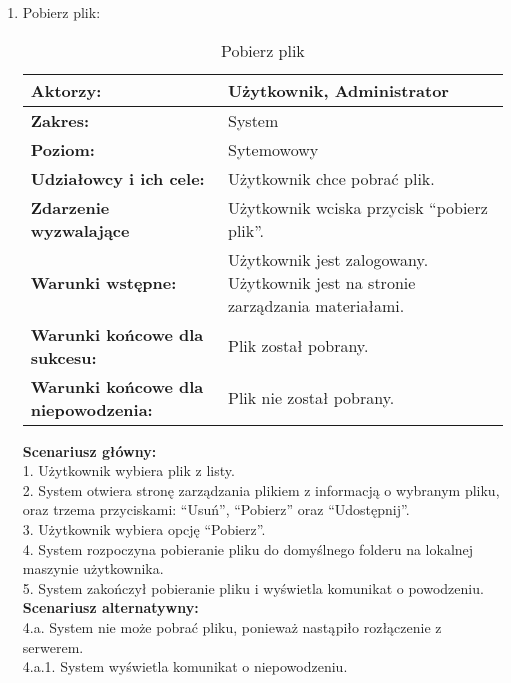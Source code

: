 \begin{enumerate}[label=(\Roman*)]
\item Pobierz plik:
	\begin{table}[H]
\centering
\caption{Pobierz plik}
\label{Pobierzplik}
\begin{tabular}{|p{7cm}|p{7cm}|}
  \hline 
  \textbf{Aktorzy:} & Użytkownik, Administrator\\
  \hline
  \textbf{Zakres:} & System \\
	\hline
  \textbf{Poziom:} & Sytemowowy \\
	\hline
  \textbf{Udziałowcy i ich cele: } & Użytkownik chce pobrać plik. \\
	\hline
  \textbf{Zdarzenie wyzwalające } & Użytkownik wciska przycisk “pobierz plik”. \\
	\hline
  \textbf{Warunki wstępne: } & Użytkownik jest zalogowany. Użytkownik jest na stronie zarządzania materiałami.
 \\
	\hline
  \textbf{Warunki końcowe dla sukcesu:} & Plik został pobrany.\\
	\hline
  \textbf{Warunki końcowe dla niepowodzenia:} & Plik nie został pobrany. \\
  \hline
\end{tabular} 
\end{table}

\textbf{Scenariusz główny:}\\
1. Użytkownik wybiera plik z listy.\\
2. System otwiera stronę zarządzania plikiem z informacją o wybranym pliku, oraz trzema przyciskami: “Usuń”, “Pobierz” oraz “Udostępnij”.\\
3. Użytkownik wybiera opcję “Pobierz”.\\
4. System rozpoczyna pobieranie pliku do domyślnego folderu na lokalnej maszynie użytkownika.\\
5. System zakończył pobieranie pliku i wyświetla komunikat o powodzeniu.\\
\textbf{Scenariusz alternatywny:}\\
4.a. System nie może pobrać pliku, ponieważ nastąpiło rozłączenie z serwerem.\\
4.a.1. System wyświetla komunikat o niepowodzeniu.\\


\end{enumerate}
